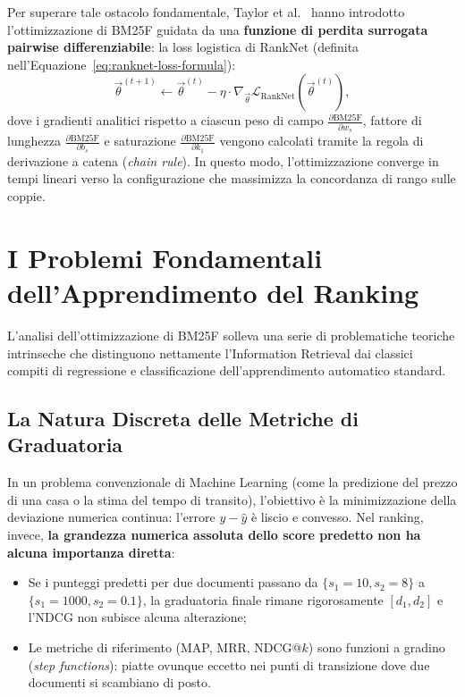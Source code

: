 Per superare tale ostacolo fondamentale, Taylor et al.~\cite{taylor2006} hanno introdotto l'ottimizzazione di BM25F guidata da una \textbf{funzione di perdita surrogata pairwise differenziabile}: la loss logistica di RankNet (definita nell'Equazione~\eqref{eq:ranknet-loss-formula}):
\begin{equation}
\vec{\theta}^{(t+1)} \gets \vec{\theta}^{(t)} - \eta \cdot \nabla_{\vec{\theta}} \mathcal{L}_{\text{RankNet}}(\vec{\theta}^{(t)}),
\end{equation}
dove i gradienti analitici rispetto a ciascun peso di campo $\frac{\partial \text{BM25F}}{\partial w_s}$, fattore di lunghezza $\frac{\partial \text{BM25F}}{\partial b_s}$ e saturazione $\frac{\partial \text{BM25F}}{\partial k_1}$ vengono calcolati tramite la regola di derivazione a catena (\textit{chain rule}). In questo modo, l'ottimizzazione converge in tempi lineari verso la configurazione che massimizza la concordanza di rango sulle coppie.

\FloatBarrier
\section{I Problemi Fondamentali dell'Apprendimento del Ranking}
\label{sec:problemi-fondamentali-ranking}

L'analisi dell'ottimizzazione di BM25F solleva una serie di problematiche teoriche intrinseche che distinguono nettamente l'Information Retrieval dai classici compiti di regressione e classificazione dell'apprendimento automatico standard.

\FloatBarrier
\subsection{La Natura Discreta delle Metriche di Graduatoria}
\label{subsec:natura-discreta-metriche}
In un problema convenzionale di Machine Learning (come la predizione del prezzo di una casa o la stima del tempo di transito), l'obiettivo \`e la minimizzazione della deviazione numerica continua: l'errore $y - \hat{y}$ \`e liscio e convesso.  
Nel ranking, invece, \textbf{la grandezza numerica assoluta dello score predetto non ha alcuna importanza diretta}:
\begin{itemize}
    \item Se i punteggi predetti per due documenti passano da $\{s_1 = 10, s_2 = 8\}$ a $\{s_1 = 1000, s_2 = 0.1\}$, la graduatoria finale rimane rigorosamente $[d_1, d_2]$ e l'NDCG non subisce alcuna alterazione;
    \item Le metriche di riferimento (MAP, MRR, NDCG@$k$) sono funzioni a gradino (\textit{step functions}): piatte ovunque eccetto nei punti di transizione dove due documenti si scambiano di posto.
\end{itemize}

